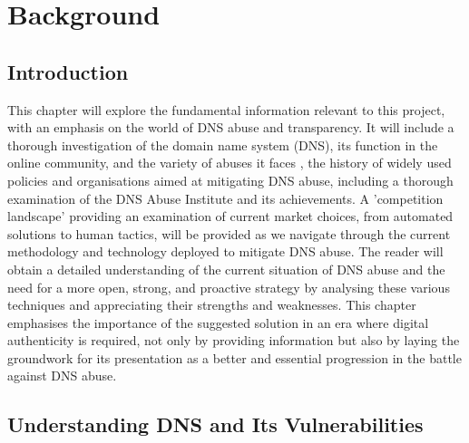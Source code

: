 \chapter{Background}
\label{Chapt2}
\section{Introduction}

This chapter will explore the fundamental information relevant to this project, with an emphasis on the world of DNS abuse and transparency. It will include a thorough investigation of the domain name system (DNS), its function in the online community, and the variety of abuses it faces , the history of widely used policies and organisations aimed at mitigating DNS abuse, including a thorough examination of the DNS Abuse Institute and its achievements. A 'competition landscape' providing an examination of current market choices, from automated solutions to human tactics, will be provided as we navigate through the current methodology and technology deployed to mitigate DNS abuse. The reader will obtain a detailed understanding of the current situation of DNS abuse and the need for a more open, strong, and proactive strategy by analysing these various techniques and appreciating their strengths and weaknesses. This chapter emphasises the importance of the suggested solution in an era where digital authenticity is required, not only by providing information but also by laying the groundwork for its presentation as a better and essential progression in the battle against DNS abuse.

\section{Understanding DNS and Its Vulnerabilities}

